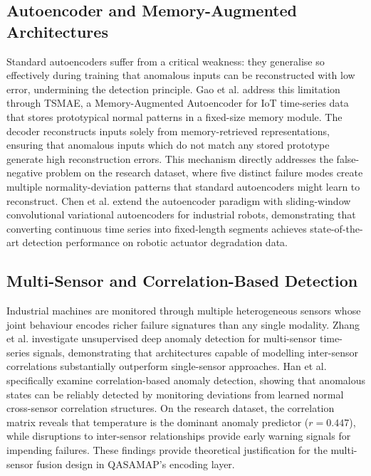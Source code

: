 \subsection{Autoencoder and Memory-Augmented Architectures}

Standard autoencoders suffer from a critical weakness: they generalise so effectively during training that anomalous inputs can be reconstructed with low error, undermining the detection principle. Gao et al. \cite{Gao2022} address this limitation through TSMAE, a Memory-Augmented Autoencoder for IoT time-series data that stores prototypical normal patterns in a fixed-size memory module. The decoder reconstructs inputs solely from memory-retrieved representations, ensuring that anomalous inputs which do not match any stored prototype generate high reconstruction errors. This mechanism directly addresses the false-negative problem on the research dataset, where five distinct failure modes create multiple normality-deviation patterns that standard autoencoders might learn to reconstruct. Chen et al. \cite{chen_unsupervised_2020} extend the autoencoder paradigm with sliding-window convolutional variational autoencoders for industrial robots, demonstrating that converting continuous time series into fixed-length segments achieves state-of-the-art detection performance on robotic actuator degradation data.

\subsection{Multi-Sensor and Correlation-Based Detection}

Industrial machines are monitored through multiple heterogeneous sensors whose joint behaviour encodes richer failure signatures than any single modality. Zhang et al. \cite{zhang_unsupervised_2021} investigate unsupervised deep anomaly detection for multi-sensor time-series signals, demonstrating that architectures capable of modelling inter-sensor correlations substantially outperform single-sensor approaches. Han et al. \cite{Han2022} specifically examine correlation-based anomaly detection, showing that anomalous states can be reliably detected by monitoring deviations from learned normal cross-sensor correlation structures. On the research dataset, the correlation matrix reveals that temperature is the dominant anomaly predictor ($r = 0.447$), while disruptions to inter-sensor relationships provide early warning signals for impending failures. These findings provide theoretical justification for the multi-sensor fusion design in QASAMAP's encoding layer.

